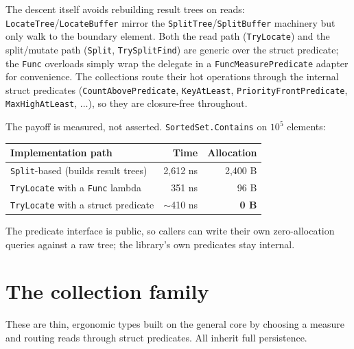 \documentclass[11pt]{article}
\newcommand{\cs}[1]{\lstinline|#1|}
\begin{document}
The descent itself avoids rebuilding result trees on reads: \cs{LocateTree}/\cs{LocateBuffer} mirror the
\cs{SplitTree}/\cs{SplitBuffer} machinery but only walk to the boundary element. Both the read path
(\cs{TryLocate}) and the split/mutate path (\cs{Split}, \cs{TrySplitFind}) are generic over the struct
predicate; the \cs{Func} overloads simply wrap the delegate in a \cs{FuncMeasurePredicate} adapter for
convenience. The collections route their hot operations through the internal struct predicates
(\cs{CountAbovePredicate}, \cs{KeyAtLeast}, \cs{PriorityFrontPredicate}, \cs{MaxHighAtLeast}, $\dots$),
so they are closure-free throughout.

The payoff is measured, not asserted. \cs{SortedSet.Contains} on $10^5$ elements:

\begin{center}
\begin{tabular}{@{}lrr@{}}
\toprule
\textbf{Implementation path} & \textbf{Time} & \textbf{Allocation} \\
\midrule
\cs{Split}-based (builds result trees) & 2{,}612 ns & 2{,}400 B \\
\cs{TryLocate} with a \cs{Func} lambda & 351 ns & 96 B \\
\cs{TryLocate} with a struct predicate & $\sim$410 ns & \textbf{0 B} \\
\bottomrule
\end{tabular}
\end{center}

The predicate interface is public, so callers can write their own zero-allocation queries against a raw
tree; the library's own predicates stay internal.

\section{The collection family}
\label{sec:collections}

These are thin, ergonomic types built on the general core by choosing a measure and routing reads through
struct predicates. All inherit full persistence.
\end{document}
